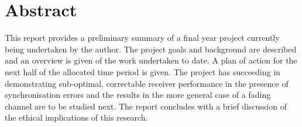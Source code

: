 

\begingroup
\let\clearpage\relax
\let\cleardoublepage\relax
\let\cleardoublepage\relax

\chapter*{Abstract} %

This report provides a preliminary summary of a final year project currently being undertaken by the author. The project goals and background are described and an overview is given of the work undertaken to date. A plan of action for the next half of the allocated time period is given. The project has succeeding in demonstrating sub-optimal, correctable receiver performance in the presence of synchronisation errors and the results in the more general case of a fading channel are to be studied next. The report concludes with a brief discussion of the ethical implications of this research.

\endgroup			

\vfill
